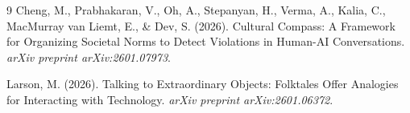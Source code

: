 \documentclass{article}
\begin{document}
\begin{thebibliography}{9}
Cheng, M., Prabhakaran, V., Oh, A., Stepanyan, H., Verma, A., Kalia, C., MacMurray van Liemt, E., \& Dev, S. (2026). Cultural Compass: A Framework for Organizing Societal Norms to Detect Violations in Human-AI Conversations. \emph{arXiv preprint arXiv:2601.07973}.

Larson, M. (2026). Talking to Extraordinary Objects: Folktales Offer Analogies for Interacting with Technology. \emph{arXiv preprint arXiv:2601.06372}.

\end{thebibliography}
\end{document}
